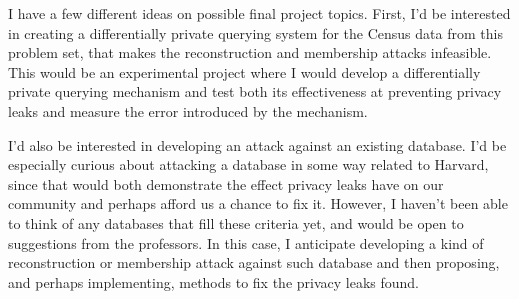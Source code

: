 \documentclass[12pt]{article}
\begin{document}
\noindent

I have a few different ideas on possible final project topics. First, I'd be interested in creating a differentially private querying system for the Census data from this problem set, that makes the reconstruction and membership attacks infeasible. This would be an experimental project where I would develop a differentially private querying mechanism and test both its effectiveness at preventing privacy leaks and measure the error introduced by the mechanism.

\bigskip

I'd also be interested in developing an attack against an existing database. I'd be especially curious about attacking a database in some way related to Harvard, since that would both demonstrate the effect privacy leaks have on our community and perhaps afford us a chance to fix it. However, I haven't been able to think of any databases that fill these criteria yet, and would be open to suggestions from the professors. In this case, I anticipate developing a kind of reconstruction or membership attack against such database and then proposing, and perhaps implementing, methods to fix the privacy leaks found.

\newpage
\end{document}

